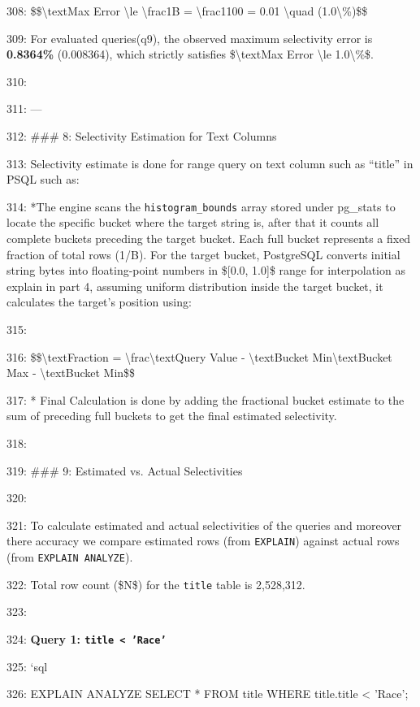 \documentclass[11pt,a4paper]{article}
\begin{document}
308: \$\$\textbackslash{}text{Max Error} \textbackslash{}le \textbackslash{}frac{1}{B} = \textbackslash{}frac{1}{100} = 0.01 \textbackslash{}quad (1.0\textbackslash{}\%)\$\$

309: For evaluated queries(q9), the observed maximum selectivity error is \textbf{0.8364\%} (0.008364), which strictly satisfies \$\textbackslash{}text{Max Error} \textbackslash{}le 1.0\textbackslash{}\%\$.

310:

311: ---

312: \#\#\# 8: Selectivity Estimation for Text Columns

313: Selectivity estimate is done for range query on text column such as “title” in PSQL such as:

314: *The engine scans the \texttt{histogram\_bounds} array stored under pg\_stats to locate the specific bucket where the target string  is, after that it counts all complete buckets preceding the target bucket. Each full bucket represents a fixed fraction of total rows (1/B). For the target bucket, PostgreSQL converts initial string bytes into floating-point numbers in \$[0.0, 1.0]\$ range for interpolation as explain in part 4,  assuming uniform distribution inside the target bucket, it calculates the target's position using:

315:

316: \$\$\textbackslash{}text{Fraction} = \textbackslash{}frac{\textbackslash{}text{Query Value} - \textbackslash{}text{Bucket Min}}{\textbackslash{}text{Bucket Max} - \textbackslash{}text{Bucket Min}}\$\$

317: *   Final Calculation is done by adding the fractional bucket estimate to the sum of preceding full buckets to get the final estimated selectivity.

318:

319: \#\#\# 9: Estimated vs. Actual Selectivities

320:

321: To calculate estimated and actual selectivities of the queries and moreover there accuracy we compare estimated rows (from \texttt{EXPLAIN}) against actual rows (from \texttt{EXPLAIN ANALYZE}).

322: Total row count (\$N\$) for the \texttt{title} table is 2,528,312.

323:

324: \textbf{Query 1: \texttt{title < 'Race'}}

325: \texttt{}`sql

326: EXPLAIN ANALYZE SELECT * FROM title WHERE title.title < 'Race';
\end{document}
